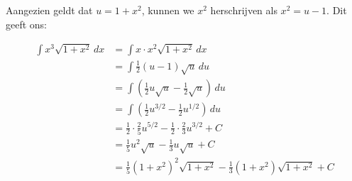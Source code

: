 \documentclass[a4paper,12pt]{article}
\begin{document}
Aangezien geldt dat $u = 1 + x^2$, kunnen we $x^2$ herschrijven als $x^2 = u - 1$.
Dit geeft ons:

\begin{align*}
    \int x^3 \sqrt{1 + x^2}\, dx    &= \int x \cdot x^2 \sqrt{1 + x^2}\, dx \\
                                    &= \int \frac{1}{2}(u - 1)\sqrt{u}\, du \\
                                    &= \int (\frac{1}{2}u\sqrt{u} - \frac{1}{2}\sqrt{u})\, du \\
                                    &= \int (\frac{1}{2}u^{3/2} - \frac{1}{2}u^{1/2})\, du \\
                                    &= \frac{1}{2}\cdot \frac{2}{5} u^{5/2} - \frac{1}{2} \cdot \frac{2}{3} u^{3/2} + C \\
                                    &= \frac{1}{5} u^2\sqrt{u} - \frac{1}{3} u\sqrt{u} + C \\
                                    &\boxed{= \frac{1}{5} (1 + x^2)^2 \sqrt{1+x^2} - \frac{1}{3} (1 + x^2)\sqrt{1+x^2} + C}
\end{align*}
\end{document}
